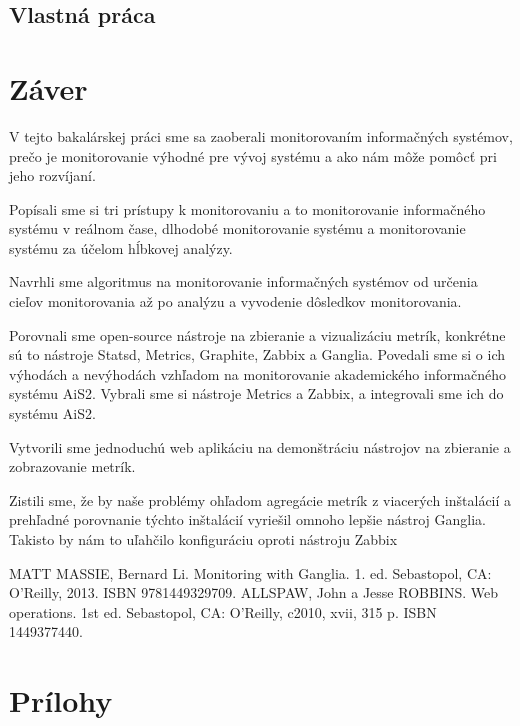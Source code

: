 \documentclass[a4paper, usesections, upjsfrontpage, thesismargins, thesislinespacing]{rnthesis}
\begin{document}
\subsection{Vlastná práca}

\newpage

\section*{Záver}

V tejto bakalárskej práci sme sa zaoberali monitorovaním informačných systémov, prečo je monitorovanie výhodné pre vývoj systému a ako nám môže pomôcť pri jeho rozvíjaní.

Popísali sme si tri prístupy k monitorovaniu a to monitorovanie informačného systému v reálnom čase, dlhodobé monitorovanie systému a monitorovanie systému za účelom hĺbkovej analýzy.

Navrhli sme algoritmus na monitorovanie informačných systémov od určenia cieľov monitorovania až po analýzu a vyvodenie dôsledkov monitorovania.

Porovnali sme open-source nástroje na zbieranie a vizualizáciu metrík, konkrétne sú to nástroje Statsd, Metrics, Graphite, Zabbix a Ganglia.
Povedali sme si o ich výhodách a nevýhodách vzhľadom na monitorovanie akademického informačného systému AiS2.
Vybrali sme si nástroje Metrics a Zabbix, a integrovali sme ich do systému AiS2.

Vytvorili sme jednoduchú web aplikáciu na demonštráciu nástrojov na zbieranie a zobrazovanie metrík.

Zistili sme, že by naše problémy ohľadom agregácie metrík z viacerých inštalácií a prehľadné porovnanie týchto inštalácií vyriešil omnoho lepšie nástroj Ganglia.
Takisto by nám to uľahčilo konfiguráciu oproti nástroju Zabbix





\renewcommand{\bibname}{Zoznam pou�itej literat�ry}
\begin{thebibliography}{9}
	 MATT MASSIE, Bernard Li. Monitoring with Ganglia. 1. ed. Sebastopol, CA: O'Reilly, 2013. ISBN 9781449329709.
	 ALLSPAW, John a Jesse ROBBINS. Web operations. 1st ed. Sebastopol, CA: O'Reilly, c2010, xvii, 315 p. ISBN 1449377440.
\end{thebibliography}
%
\newpage
\section*{Prílohy}
\end{document}
